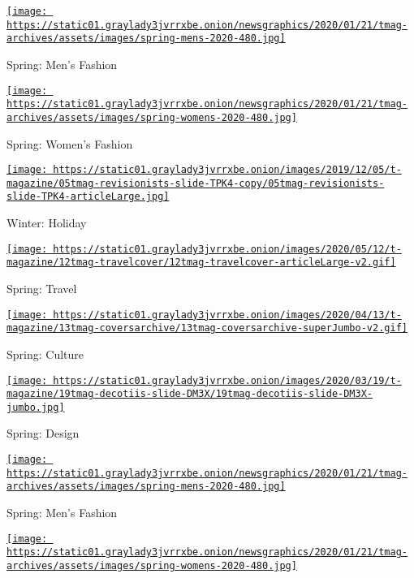 \href{https://www.nytimes3xbfgragh.onion/issue/t-magazine/2020/02/21/ts-march-8-mens-fashion-issue}{\texttt{[image: https://static01.graylady3jvrrxbe.onion/newsgraphics/2020/01/21/tmag-archives/assets/images/spring-mens-2020-480.jpg]}}

Spring: Men's Fashion

\href{https://www.nytimes3xbfgragh.onion/issue/t-magazine/2020/02/06/ts-feb-23-womens-fashion-issue}{\texttt{[image: https://static01.graylady3jvrrxbe.onion/newsgraphics/2020/01/21/tmag-archives/assets/images/spring-womens-2020-480.jpg]}}

Spring: Women's Fashion

\href{https://www.nytimes3xbfgragh.onion/issue/t-magazine/2019/11/21/ts-dec-8-holiday-issue}{\texttt{[image: https://static01.graylady3jvrrxbe.onion/images/2019/12/05/t-magazine/05tmag-revisionists-slide-TPK4-copy/05tmag-revisionists-slide-TPK4-articleLarge.jpg]}}

Winter: Holiday

\href{https://www.nytimes3xbfgragh.onion/issue/t-magazine/2020/05/02/ts-may-17-travel-issue}{\texttt{[image: https://static01.graylady3jvrrxbe.onion/images/2020/05/12/t-magazine/12tmag-travelcover/12tmag-travelcover-articleLarge-v2.gif]}}

Spring: Travel

\href{https://www.nytimes3xbfgragh.onion/issue/t-magazine/2020/04/12/ts-april-19-culture-issue}{\texttt{[image: https://static01.graylady3jvrrxbe.onion/images/2020/04/13/t-magazine/13tmag-coversarchive/13tmag-coversarchive-superJumbo-v2.gif]}}

Spring: Culture

\href{https://www.nytimes3xbfgragh.onion/issue/t-magazine/2020/03/06/ts-march-22-design-issue}{\texttt{[image: https://static01.graylady3jvrrxbe.onion/images/2020/03/19/t-magazine/19tmag-decotiis-slide-DM3X/19tmag-decotiis-slide-DM3X-jumbo.jpg]}}

Spring: Design

\href{https://www.nytimes3xbfgragh.onion/issue/t-magazine/2020/02/21/ts-march-8-mens-fashion-issue}{\texttt{[image: https://static01.graylady3jvrrxbe.onion/newsgraphics/2020/01/21/tmag-archives/assets/images/spring-mens-2020-480.jpg]}}

Spring: Men's Fashion

\href{https://www.nytimes3xbfgragh.onion/issue/t-magazine/2020/02/06/ts-feb-23-womens-fashion-issue}{\texttt{[image: https://static01.graylady3jvrrxbe.onion/newsgraphics/2020/01/21/tmag-archives/assets/images/spring-womens-2020-480.jpg]}}

